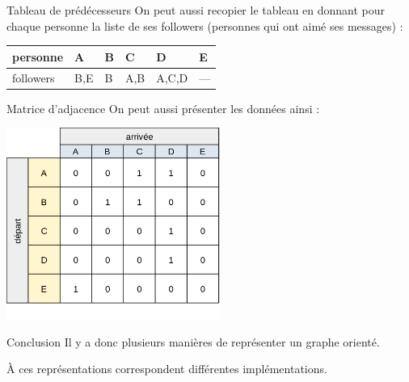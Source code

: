 \documentclass[10pt]{beamer}
\begin{document}
\begin{frame}{Tableau de prédécesseurs}
On peut aussi recopier le tableau en donnant pour chaque personne la liste de ses \og followers\fg{} (personnes qui ont aimé ses messages) :

\begin{center}
\begin{tabular}{|l|>{\centering\arraybackslash}p{1cm}|>{\centering\arraybackslash}p{1cm}|>{\centering\arraybackslash}p{1cm}|>{\centering\arraybackslash}p{1cm}|>{\centering\arraybackslash}p{1cm}|}
\hline\rowcolor{beamerBlack}
\textbf{\color{beamerWhite}personne}& \textbf{\color{beamerWhite}A} & \textbf{\color{beamerWhite}B} &\textbf{\color{beamerWhite}C}& \textbf{\color{beamerWhite}D} & \textbf{\color{beamerWhite}E} \\
\hline
followers  & B,E & B & A,B & A,C,D & --- \\
\hline
\end{tabular}
\end{center}
\end{frame}

\begin{frame}{Matrice d'adjacence}
On peut aussi présenter les données ainsi :

\begin{center}
\includegraphics[width=7cm]{img/prematrice.png}
\end{center}
\end{frame}

\begin{frame}{Conclusion}
Il y a donc plusieurs manières de représenter un graphe orienté.\\\pause

À ces représentations correspondent différentes \alert{implémentations}.
\end{frame}
\end{document}
